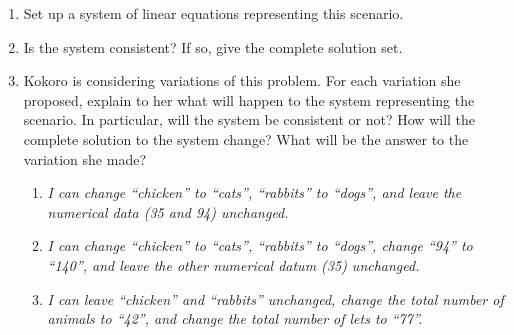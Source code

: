 \begin{exercises}
\begin{problist}
    \begin{enumerate}
      \item Set up a system of linear equations representing this scenario. 
      \item Is the system consistent? If so, give the complete solution set.
      \item Kokoro is considering variations of this problem. For each variation she proposed, explain to her what will happen to the system representing the scenario. In particular, will the system be consistent or not? How will the complete solution to the system change? What will be the answer to the variation she made?
      \begin{enumerate}
        \item \emph{I can change ``chicken'' to ``cats'', ``rabbits'' to ``dogs'', and leave the numerical data (35 and 94) unchanged.}
        \item \emph{I can change ``chicken'' to ``cats'', ``rabbits'' to ``dogs'', change ``94'' to ``140'', and leave the other numerical datum (35) unchanged.}
        \item \emph{I can leave ``chicken'' and ``rabbits'' unchanged, change the total number of animals to ``42'', and change the total number of lets to ``77''.}
      \end{enumerate}
    \end{enumerate}
	\end{problist}
\end{exercises}
